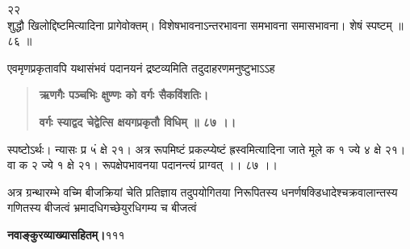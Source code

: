 \documentclass[11pt, openany]{book}
\begin{document}
\begin{sloppypar}
\hspace{1.2in}२\hspace{0.2in}२\\

\hangindent=0.2in शुद्धौ खिलोद्दिष्टमित्यादिना प्रागेवोक्तम्। विशेषभावनाऽन्तरभावना समभावना समासभावना। शेषं स्पष्टम् ॥ ८६ ॥ 

\hangindent=0.2in \hspace{0.2in}एवमृणप्रकृतावपि यथासंभवं पदानयनं द्रष्टव्यमिति तदुदाहरणमनुष्टुभाऽऽह\textendash

\begin{quote}
\hspace{1in}\textbf{ऋणगैः पञ्चभिः क्षुण्णः को वर्गः सैकविंशतिः।}

\hspace{1in}\textbf{वर्गः स्याद्वद चेद्वेत्सि क्षयगप्रकृतौ विधिम् ॥ ८७ ।।}
\end{quote}

\hangindent=0.2in \hspace{0.2in}स्पष्टोऽर्थः। न्यासः प्र ५ं क्षे २१। अत्र रूपमिष्टं प्रकल्प्येष्टं ह्रस्वमित्यादिना जाते मूले क १ ज्ये ४ क्षे २१। वा क २ ज्ये १ क्षे २१। रूपक्षेपभावनया पदानन्त्यं प्राग्वत् ।। ८७ ।।

\hangindent=0.2in \hspace{0.2in}अत्र ग्रन्थारम्भे वच्मि बीजक्रियां चेति प्रतिज्ञाय तदुपयोगितया निरूपितस्य धनर्णषक्डिधादेश्चक्रवालान्तस्य गणितस्य बीजत्वं भ्रमादधिगच्छेयुरधिगम्य च बीजत्वं
\end{sloppypar}
\thispagestyle{empty}
\newpage

\onehalfspacing
\hspace{2in}\textbf{नवाङ्कुरव्याख्यासहितम्।}\hspace{2in}१११

\vspace{5mm}
\end{document}
